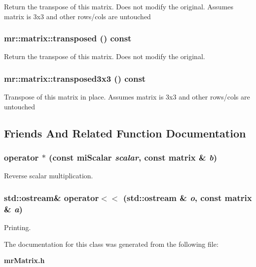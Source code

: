 Return the transpose of this matrix. Does not modify the original. Assumes matrix is 3x3 and other rows/cols are untouched 
\subsubsection{ mr::matrix::transposed () const\hspace{0.3cm}{\tt  [inline]}}\label{classmr_1_1matrix_z23_0}


Return the transpose of this matrix. Does not modify the original. 
\subsubsection{ mr::matrix::transposed3x3 () const\hspace{0.3cm}{\tt  [inline]}}\label{classmr_1_1matrix_z23_7}


Transpose of this matrix in place. Assumes matrix is 3x3 and other rows/cols are untouched 

\subsection{Friends And Related Function Documentation}
\subsubsection{ operator $\ast$ (const mi\-Scalar {\em scalar}, const {\bf matrix} \& {\em b})\hspace{0.3cm}{\tt  [friend]}}\label{classmr_1_1matrix_z24_3}


Reverse scalar multiplication. 

\subsubsection{\setlength{\rightskip}{0pt plus 5cm}std::ostream\& operator$<$$<$ (std::ostream \& {\em o}, const {\bf matrix} \& {\em a})\hspace{0.3cm}{\tt  [friend]}}\label{classmr_1_1matrix_z24_2}


Printing. 



The documentation for this class was generated from the following file:\begin{CompactItemize}
\item 
{\bf mr\-Matrix.h}\end{CompactItemize}
